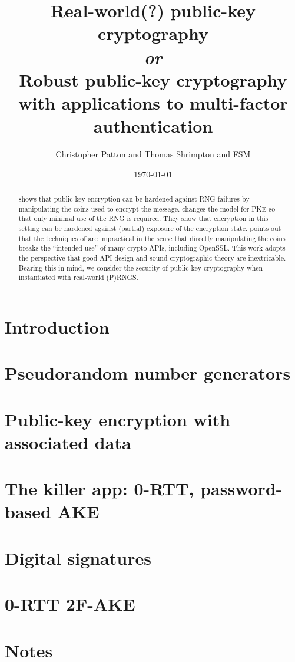 \documentclass{build/llncs}
\date{\today}
\title{Real-world{\color{gray}(?)} public-key cryptography\\
\emph{\color{gray}or}\\
Robust public-key cryptography with applications to multi-factor authentication
}
\author{Christopher Patton and Thomas Shrimpton and FSM}
\institute{}
\begin{document}
\maketitle

\begin{abstract}
  \cite{bellare2009hedged} shows that public-key encryption can be hardened
  against RNG failures by manipulating the coins used to encrypt the message.
  \cite{bellare2016nonce} changes the model for PKE so that only minimal use of
  the RNG is required. They show that encryption in this setting can be hardened
  against (partial) exposure of the encryption state.
  \cite{boldyreva2017real} points out that the techniques of
  \cite{bellare2009hedged,bellare2016nonce} are impractical in the sense that
  directly manipulating the coins breaks the ``intended use'' of many crypto
  APIs, including OpenSSL.
  This work adopts the perspective that good API design and sound cryptographic
  theory are inextricable.
  Bearing this in mind, we consider the security of public-key cryptography
  when instantiated with real-world (P)RNGS.
\end{abstract}

\section{Introduction}


\section{Pseudorandom number generators}


\section{Public-key encryption with associated data}


\section{The killer app: 0-RTT, password-based AKE}


\section{Digital signatures}


\section{0-RTT 2F-AKE}


\section{Notes}




\end{document}
